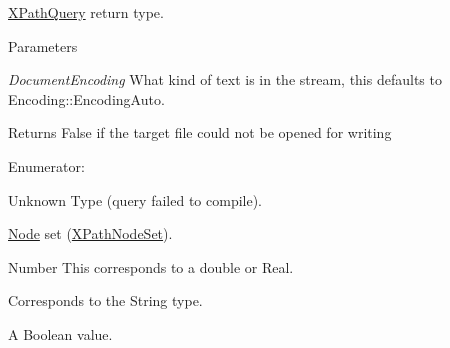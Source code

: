 \hyperlink{classphys_1_1xml_1_1XPathQuery}{XPathQuery} return type. 


\begin{DoxyParams}{Parameters}
\item[{\em DocumentEncoding}]What kind of text is in the stream, this defaults to Encoding::EncodingAuto. \end{DoxyParams}
\begin{DoxyReturn}{Returns}
False if the target file could not be opened for writing 
\end{DoxyReturn}
\begin{Desc}
\item[Enumerator: ]\par
\begin{description}
\item[{\em 
\hypertarget{namespacephys_1_1xml_a339b9eef674ba44100110e5524bc575dabf243ef424b79e9da4f5e52fca25bbe5}{
XPathTypeNone}
\label{d9/d27/namespacephys_1_1xml_a339b9eef674ba44100110e5524bc575dabf243ef424b79e9da4f5e52fca25bbe5}
}]Unknown Type (query failed to compile). \item[{\em 
\hypertarget{namespacephys_1_1xml_a339b9eef674ba44100110e5524bc575dacb1f770045b8cfe7634feb3c2745b0ba}{
XPathTypeNodeSet}
\label{d9/d27/namespacephys_1_1xml_a339b9eef674ba44100110e5524bc575dacb1f770045b8cfe7634feb3c2745b0ba}
}]\hyperlink{classphys_1_1xml_1_1Node}{Node} set (\hyperlink{classphys_1_1xml_1_1XPathNodeSet}{XPathNodeSet}). \item[{\em 
\hypertarget{namespacephys_1_1xml_a339b9eef674ba44100110e5524bc575da5503130cd89cdb7f6c9f0cc72091a06c}{
XPathTypeNumber}
\label{d9/d27/namespacephys_1_1xml_a339b9eef674ba44100110e5524bc575da5503130cd89cdb7f6c9f0cc72091a06c}
}]Number This corresponds to a double or Real. \item[{\em 
\hypertarget{namespacephys_1_1xml_a339b9eef674ba44100110e5524bc575da1201c2db15249e26d46d828213e1e88b}{
XPathTypeString}
\label{d9/d27/namespacephys_1_1xml_a339b9eef674ba44100110e5524bc575da1201c2db15249e26d46d828213e1e88b}
}]Corresponds to the String type. \item[{\em 
\hypertarget{namespacephys_1_1xml_a339b9eef674ba44100110e5524bc575da7d21654ec17f33027de173dd47aa9092}{
XPathTypeBoolean}
\label{d9/d27/namespacephys_1_1xml_a339b9eef674ba44100110e5524bc575da7d21654ec17f33027de173dd47aa9092}
}]A Boolean value. \end{description}
\end{Desc}



